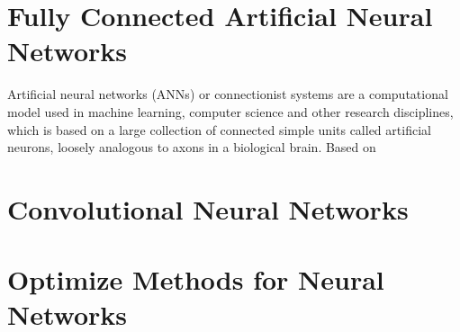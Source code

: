 \section{Fully Connected Artificial Neural Networks}

Artificial neural networks (ANNs) or connectionist systems are a computational model used in machine learning, 
computer science and other research disciplines, which is based on a large collection of connected simple units called artificial neurons, 
loosely analogous to axons in a biological brain\cite{kohonen1988introduction}.
Based on 

\section{Convolutional Neural Networks}

\section{Optimize Methods for Neural Networks}
